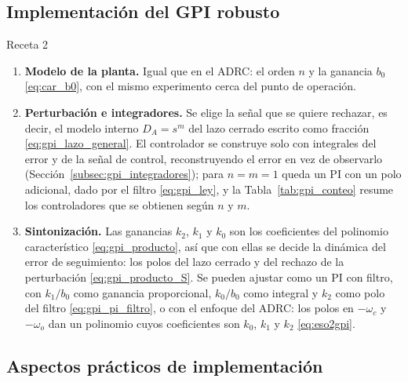 \subsection{Implementación del GPI robusto}

\begin{recuadro}{Receta 2}
\begin{enumerate}\setlength{\itemsep}{2pt}
  \item \textbf{Modelo de la planta.} Igual que en el ADRC: el orden $n$ y la ganancia $b_0$
  \eqref{eq:car_b0}, con el mismo experimento cerca del punto de operación.
  \item \textbf{Perturbación e integradores.} Se elige la señal que se quiere rechazar, es decir, el
  modelo interno $D_A = s^m$ del lazo cerrado escrito como fracción \eqref{eq:gpi_lazo_general}. El
  controlador se construye solo con integrales del error y de la señal de control, reconstruyendo el
  error en vez de observarlo (Sección~\ref{subsec:gpi_integradores}); para $n = m = 1$ queda un PI con
  un polo adicional, dado por el filtro \eqref{eq:gpi_ley}, y la Tabla~\ref{tab:gpi_conteo} resume los
  controladores que se obtienen según $n$ y $m$.
  \item \textbf{Sintonización.} Las ganancias $k_2$, $k_1$ y $k_0$ son los coeficientes del polinomio
  característico \eqref{eq:gpi_producto}, así que con ellas se decide la dinámica del error de
  seguimiento: los polos del lazo cerrado y del rechazo de la perturbación \eqref{eq:gpi_producto_S}.
  Se pueden ajustar como un PI con filtro, con $k_1/b_0$ como ganancia proporcional, $k_0/b_0$ como
  integral y $k_2$ como polo del filtro \eqref{eq:gpi_pi_filtro}, o con el enfoque del ADRC: los
  polos en $-\omega_c$ y $-\omega_o$ dan un polinomio cuyos coeficientes son $k_0$, $k_1$ y $k_2$
  \eqref{eq:eso2gpi}.
\end{enumerate}
\end{recuadro}

\subsection{Aspectos prácticos de implementación}

